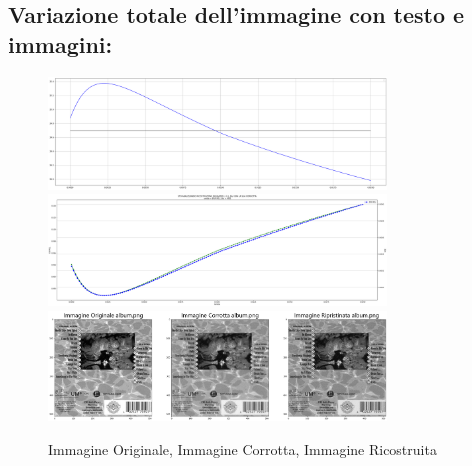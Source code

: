 {\color{rred}\subsection{Variazione totale dell'immagine con testo e immagini:}}
\begin{figure}[H]{}
    \centering
    \includegraphics[width=0.8\textwidth]{IMMAGINI_RELAZIONE/graficoAlbumTOTVAR_ERRREL&MSE.png}
    \includegraphics[width=0.8\textwidth]{IMMAGINI_RELAZIONE/graficoAlbumTOTVAR_PSNR&suaMedia.png}
    \includegraphics[width=0.8\textwidth]{IMMAGINI_RELAZIONE/eventuale_ricostruzioneTOTVAR_Album_33.71.png}
    \caption{Immagine Originale, Immagine Corrotta, Immagine Ricostruita}
\end{figure}
